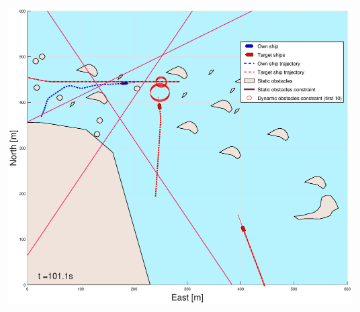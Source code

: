 \begin{figure}[!ht]
\begin{subfigure}[b]{0.494\textwidth}
        \subcaption{}
    \end{subfigure}
    \hfill
    \\
    \begin{subfigure}[b]{0.494\textwidth}
        \centering
        \includegraphics[width=\textwidth]{Images/Figures/skjergard_m_trafikk_NEW/_Simple_1fig1_time=101}
        \subcaption{}
    \end{subfigure}
    \hfill
    \begin{subfigure}[b]{0.494\textwidth}
        \centering

\end{subfigure}
\end{figure}

